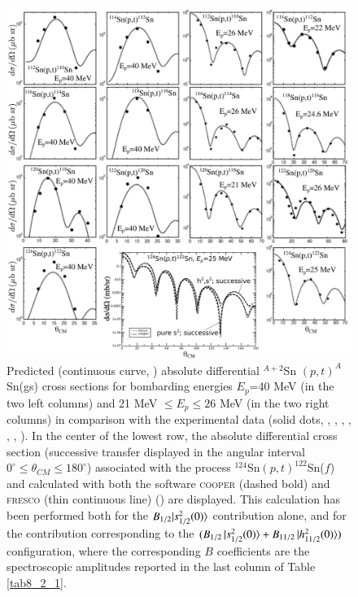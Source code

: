   \begin{figure}
  \centerline{\includegraphics*[width=15cm,angle=0]{C8/figsC8/fig8_2_4}}
  	\caption{Predicted (continuous curve, \cite{Potel:13,Potel:13b}) absolute differential $^{A+2}$Sn $(p,t)^A$Sn(gs) cross sections for bombarding
  	energies $E_p$=40 MeV (in the two left columns) and 21 MeV $\leq E_p \leq 26$ MeV (in the two right columns) in comparison with the
  	experimental data (solid dots, \cite{Bassani:65}, \cite{Guazzoni:99}, \cite{Guazzoni:04}, \cite{Guazzoni:06}, \cite{Guazzoni:08}, \cite{Guazzoni:11}, \cite{Guazzoni:12}). In the center of the lowest row, the absolute differential cross section (successive transfer displayed in the angular interval $0^\circ\leq\theta_{CM}\leq180^\circ$) associated with the process $^{124}$Sn$(p,t)^{122}$Sn($f$)  and calculated with both the software \textsc{cooper} (dashed bold) and  \textsc{fresco} (thin continuous line) (\cite{Thompson:88}) are displayed. This  calculation has been performed both for the $B_{1/2}|{s_{1/2}^2(0)} \rangle$ contribution alone, and for the contribution corresponding to the $(B_{1/2}\,|{s_{1/2}^2(0)} \rangle+B_{11/2}\,|{h_{11/2}^2(0)} \rangle)$ configuration, where the corresponding $B$ coefficients are the spectroscopic amplitudes reported in the last column of Table \ref{tab8_2_1}. 
  }\label{fig8_2_4}
  \end{figure}
  



